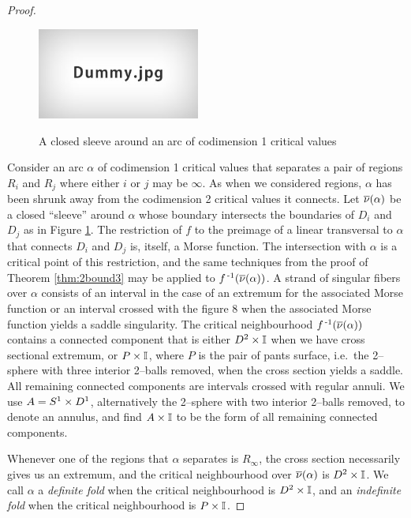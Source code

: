 \begin{proof}
	\begin{figure}
		\centering
		\caption{A closed sleeve around an arc of codimension 1 critical values}
		\includegraphics[height=3cm]{figures/dummy.jpg}
		\label{fig:arcsleeve}
	\end{figure}
	
	Consider an arc $\alpha$ of codimension 1 critical values that separates a pair of regions $R_i$ and $R_j$ where either $i$ or $j$ may be $\infty$.
	As when we considered regions, $\alpha$ has been shrunk away from the codimension 2 critical values it connects.
	Let $\overline{\nu}(\alpha)$ be a closed ``sleeve'' around $\alpha$ whose boundary intersects the boundaries of $D_i$ and $D_j$ as in Figure \ref{fig:arcsleeve}.
	The restriction of $f$ to the preimage of a linear transversal to $\alpha$ that connects $D_i$ and $D_j$ is, itself, a Morse function.
	The intersection with $\alpha$ is a critical point of this restriction, and the same techniques from the proof of Theorem \ref{thm:2bound3} may be applied to $f^{\,\text{-}1}(\overline{\nu}(\alpha))$.
	A strand of singular fibers over $\alpha$ consists of an interval in the case of an extremum for the associated Morse function or an interval crossed with the figure 8 when the associated Morse function yields a saddle singularity.
	The critical neighbourhood $f^{\,\text{-}1}(\overline{\nu}(\alpha))$ contains a connected component that is either $D^2\times\mathbb{I}$ when we have cross sectional extremum, or $P\times\mathbb{I}$, where $P$ is the pair of pants surface, i.e.\ the 2--sphere with three interior 2--balls removed, when the cross section yields a saddle.
	All remaining connected components are intervals crossed with regular annuli.
	We use $A=S^1\times D^1$, alternatively the 2--sphere with two interior 2--balls removed, to denote an annulus, and find $A\times\mathbb{I}$ to be the form of all remaining connected components.
	
	Whenever one of the regions that $\alpha$ separates is $R_\infty$, the cross section necessarily gives us an extremum, and the critical neighbourhood over $\overline{\nu}(\alpha)$ is $D^2\times\mathbb{I}$.
	We call $\alpha$ a \emph{definite fold} when the critical neighbourhood is $D^2\times\mathbb{I}$, and an \emph{indefinite fold} when the critical neighbourhood is $P\times\mathbb{I}$.
	

\end{proof}
